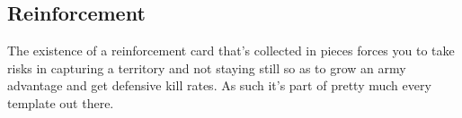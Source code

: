 \subsection{Reinforcement}

The existence of a reinforcement card that's collected in pieces forces you to take risks in capturing a territory and not staying still so as to grow an army advantage and get defensive kill rates. As such it's part of pretty much every template out there.